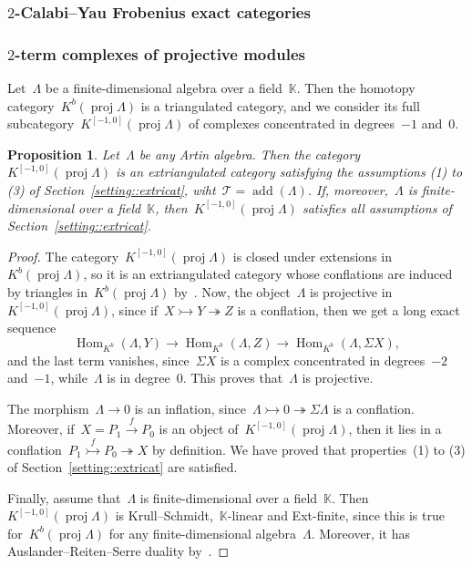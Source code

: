 \documentclass{amsart}
\newtheorem{proposition}[theorem]{Proposition}
\theoremstyle{definition}
\newcommand{\field}{\mathbb{K}}
\newcommand{\Hom}[1]{\operatorname{Hom}_{#1}}
\newcommand{\susp}{\Sigma}
\newcommand{\add}{\operatorname{add}}
\newcommand{\proj}{\operatorname{proj}}
\newcommand{\tc}{\mathcal{T}}
\newcommand{\infl}{\rightarrowtail}
\newcommand{\defl}{\twoheadrightarrow}
\begin{document}
\subsubsection{$2$-Calabi--Yau Frobenius exact categories}
\label{sect::2CYexact}

\subsubsection{$2$-term complexes of projective modules}
\label{sect::Kbproj}
Let~$\Lambda$ be a finite-dimensional algebra over a field~$\field$.  Then the homotopy category~$K^b(\proj \Lambda)$ is a triangulated category, and we consider its full subcategory~$K^{[-1,0]}(\proj \Lambda)$ of complexes concentrated in degrees~$-1$ and~$0$.

\begin{proposition}
\label{prop::2kbproj-is-extriangulated}
 Let~$\Lambda$ be any Artin algebra.  Then the category~$K^{[-1,0]}(\proj \Lambda)$ is an extriangulated category satisfying the assumptions (1) to (3) of Section~\ref{setting::extricat}, wiht~$\tc = \add(\Lambda)$.  If, moreover,~$\Lambda$ is finite-dimensional over a field~$\field$, then~$K^{[-1,0]}(\proj \Lambda)$ satisfies all assumptions of Section~\ref{setting::extricat}. 
\end{proposition}
\begin{proof}
 The category~$K^{[-1,0]}(\proj \Lambda)$ is closed under extensions in~$K^b(\proj \Lambda)$, so it is an extriangulated category whose conflations are induced by triangles in~$K^b(\proj\Lambda)$ by~\cite[Remark 2.18]{NakaokaPalu}.  Now, the object~$\Lambda$ is projective in~$K^{[-1,0]}(\proj \Lambda)$, since if~$X\infl Y\defl Z$ is a conflation, then we get a long exact sequence
 \[
  \Hom{K^b}(\Lambda,Y)\to \Hom{K^b}(\Lambda,Z) \to  \Hom{K^b}(\Lambda, \susp X),
 \]
 and the last term vanishes, since~$\susp X$ is a complex concentrated in degrees~$-2$ and~$-1$, while~$\Lambda$ is in degree~$0$.  This proves that~$\Lambda$ is projective.
 
 The morphism~$\Lambda \to 0$ is an inflation, since~$\Lambda\infl 0 \defl \susp \Lambda$ is a conflation.  Moreover, if~$X= P_1\xrightarrow{f}P_0$ is an object of~$K^{[-1,0]}(\proj\Lambda)$, then it lies in a conflation~$P_1\stackrel{f}{\infl} P_0 \defl X$ by definition.  We have proved that properties~(1) to (3) of Section~\ref{setting::extricat} are satisfied.
 
 Finally, assume that~$\Lambda$ is finite-dimensional over a field~$\field$.  Then~$K^{[-1,0]}(\proj\Lambda)$ is Krull--Schmidt,~$\field$-linear and Ext-finite, since this is true for~$K^b(\proj\Lambda)$ for any finite-dimensional algebra~$\Lambda$.  Moreover, it has Auslander--Reiten--Serre duality by~\cite[Proposition 6.1]{IyamaNakaokaPalu}.
\end{proof}
\end{document}
